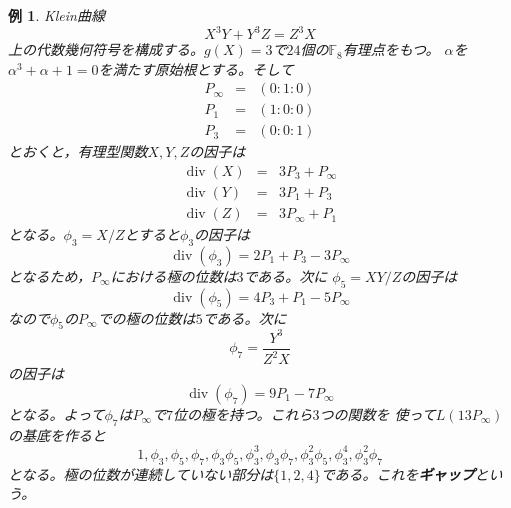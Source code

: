 \documentclass[12pt]{jarticle}
\theoremstyle{break}
\newtheorem{example}[theorem]{例}
\def\bF{\mathbb{F}}
\def\div{\operatorname{div}}
\begin{document}
\begin{example}
{\rm Klein}曲線
\begin{equation}
X^{3}Y+Y^{3}Z=Z^{3}X\nonumber
\end{equation}
上の代数幾何符号を構成する。$g(X)=3$で$24$個の$\bF_{8}$有理点をもつ。
$\alpha$を$\alpha^{3}+\alpha+1=0$を満たす原始根とする。そして
\begin{eqnarray}
P_{\infty}&=&(0:1:0)\nonumber\\
P_{1}&=&(1:0:0)\nonumber\\
P_{3}&=&(0:0:1)\nonumber
\end{eqnarray}
とおくと，有理型関数$X,Y,Z$の因子は
\begin{eqnarray}
\div(X)&=&3P_{3}+P_{\infty}\nonumber\\
\div(Y)&=&3P_{1}+P_{3}\nonumber\\
\div(Z)&=&3P_{\infty}+P_{1}\nonumber
\end{eqnarray}
となる。$\phi_{3}=X/Z$とすると$\phi_{3}$の因子は
\begin{equation}
\div(\phi_{3})=2P_{1}+P_{3}-3P_{\infty}\nonumber
\end{equation}
となるため，$P_{\infty}$における極の位数は$3$である。次に
$\phi_{5}=XY/Z$の因子は
\begin{equation}
\div(\phi_{5})=4P_{3}+P_{1}-5P_{\infty}\nonumber
\end{equation}
なので$\phi_{5}$の$P_{\infty}$での極の位数は$5$である。次に
\begin{equation}
\phi_{7}=\frac{Y^{3}}{Z^{2}X}\nonumber
\end{equation}
の因子は
\begin{equation}
\div(\phi_{7})=9P_{1}-7P_{\infty}\nonumber
\end{equation}
となる。よって$\phi_{7}$は$P_{\infty}$で$7$位の極を持つ。これら$3$つの関数を
使って$L(13P_{\infty})$の基底を作ると
\begin{equation}
1,\phi_{3},\phi_{5},\phi_{7},\phi_{3}\phi_{5},\phi_{3}^{3},
\phi_{3}\phi_{7},\phi_{3}^{2}\phi_{5},\phi_{3}^{4},\phi_{3}^{2}\phi_{7}
\nonumber
\end{equation}
となる。極の位数が連続していない部分は$\{1,2,4\}$である。これを{\bf ギャップ}という。


\end{example}
\end{document}
